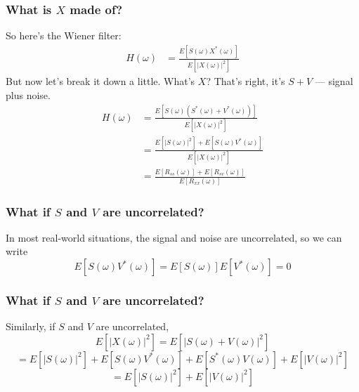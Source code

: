 \documentclass{beamer}
\begin{document}
\begin{frame}
  \frametitle{What is $X$ made of?}

  So here's the Wiener filter:
  \begin{align*}
    H(\omega)&=\frac{E\left[S(\omega)X^*(\omega)\right]}{E\left[|X(\omega)|^2\right]}
  \end{align*}
  But now let's break it down a little.  What's $X$?  That's right,
  it's $S+V$ --- signal plus noise.
  \begin{align*}
    H(\omega)
    &=\frac{E\left[S(\omega)(S^*(\omega)+V^*(\omega))\right]}{E\left[|X(\omega)|^2\right]}\\
    &=\frac{E\left[|S(\omega)|^2\right]+E\left[S(\omega)V^*(\omega)\right]}{E\left[|X(\omega)|^2\right]}\\
    &=\frac{E\left[R_{ss}(\omega)\right]+E\left[R_{sv}(\omega)\right]}{E\left[R_{xx}(\omega)\right]}
  \end{align*}
\end{frame}

\begin{frame}
  \frametitle{What if $S$ and $V$ are uncorrelated?}

  In most real-world situations, the signal and noise are
  uncorrelated, so we can write
  \begin{displaymath}
    E\left[S(\omega)V^*(\omega)\right]=E\left[S(\omega)\right]E\left[V^*(\omega)\right]=0
  \end{displaymath}
\end{frame}

\begin{frame}
  \frametitle{What if $S$ and $V$ are uncorrelated?}

  Similarly, if $S$ and $V$ are uncorrelated,
  \begin{displaymath}
    E\left[|X(\omega)|^2\right]
    =E\left[|S(\omega)+V(\omega)|^2\right]
  \end{displaymath}
  \begin{displaymath}
    =E\left[|S(\omega)|^2\right]+E\left[S(\omega)V^*(\omega)\right]
    +E\left[S^*(\omega)V(\omega)\right]+E\left[|V(\omega)|^2\right]
  \end{displaymath}
  \begin{displaymath}
    =E\left[|S(\omega)|^2\right]+E\left[|V(\omega)|^2\right]
  \end{displaymath}
\end{frame}
\end{document}

